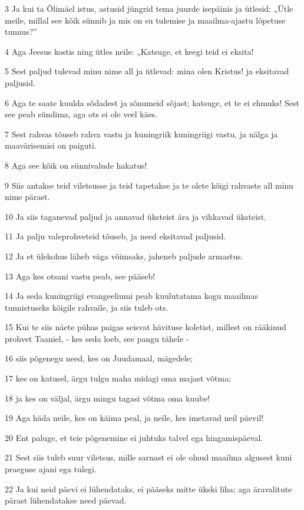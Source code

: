 \par 3 Ja kui ta Õlimäel istus, astusid jüngrid tema juurde isepäinis ja ütlesid: „Ütle meile, millal see kõik sünnib ja mis on su tulemise ja maailma-ajastu lõpetuse tunnus?”
\par 4 Aga Jeesus kostis ning ütles neile: „Katsuge, et keegi teid ei eksita!
\par 5 Sest paljud tulevad minu nime all ja ütlevad: mina olen Kristus! ja eksitavad paljusid.
\par 6 Aga te saate kuulda sõdadest ja sõnumeid sõjast; katsuge, et te ei ehmuks! Sest see peab sündima, aga ots ei ole veel käes.
\par 7 Sest rahvas tõuseb rahva vastu ja kuningriik kuningriigi vastu, ja nälga ja maavärisemisi on paiguti.
\par 8 Aga see kõik on sünnivalude hakatus!
\par 9 Siis antakse teid viletsusse ja teid tapetakse ja te olete kõigi rahvaste all minu nime pärast.
\par 10 Ja siis taganevad paljud ja annavad üksteist ära ja vihkavad üksteist.
\par 11 Ja palju valeprohveteid tõuseb, ja need eksitavad paljusid.
\par 12 Ja et ülekohus läheb väga võimsaks, jaheneb paljude armastus.
\par 13 Aga kes otsani vastu peab, see pääseb!
\par 14 Ja seda kuningriigi evangeeliumi peab kuulutatama kogu maailmas tunnistuseks kõigile rahvaile, ja siis tuleb ots.
\par 15 Kui te siis näete pühas paigas seisvat hävituse koletist, millest on rääkinud prohvet Taaniel, - kes seda loeb, see pangu tähele -
\par 16 siis põgenegu need, kes on Juudamaal, mägedele;
\par 17 kes on katusel, ärgu tulgu maha midagi oma majast võtma;
\par 18 ja kes on väljal, ärgu mingu tagasi võtma oma kuube!
\par 19 Aga häda neile, kes on käima peal, ja neile, kes imetavad neil päevil!
\par 20 Ent paluge, et teie põgenemine ei juhtuks talvel ega hingamispäeval.
\par 21 Sest siis tuleb suur viletsus, mille sarnast ei ole olnud maailma algusest kuni praeguse ajani ega tulegi.
\par 22 Ja kui neid päevi ei lühendataks, ei pääseks mitte ükski liha; aga äravalitute pärast lühendatakse need päevad.
